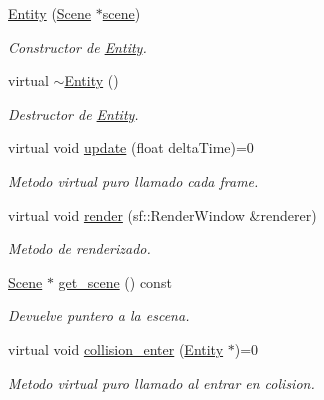 \begin{DoxyCompactItemize}
\item 
\mbox{\hyperlink{classexample_1_1_entity_aa2154c66b8b0142ef510137bb67e643b}{Entity}} (\mbox{\hyperlink{classexample_1_1_scene}{Scene}} $\ast$\mbox{\hyperlink{classexample_1_1_entity_ab851dbde4a16829f9fb77ab9a66b9f1e}{scene}})
\begin{DoxyCompactList}\small\item\em Constructor de \mbox{\hyperlink{classexample_1_1_entity}{Entity}}. \end{DoxyCompactList}\item 
virtual \mbox{\hyperlink{classexample_1_1_entity_a7ad532833fe996de3a728570b70a2c1d}{$\sim$\+Entity}} ()
\begin{DoxyCompactList}\small\item\em Destructor de \mbox{\hyperlink{classexample_1_1_entity}{Entity}}. \end{DoxyCompactList}\item 
virtual void \mbox{\hyperlink{classexample_1_1_entity_a5dded5c361451f2cfdf7ed3c7de1194f}{update}} (float delta\+Time)=0
\begin{DoxyCompactList}\small\item\em Metodo virtual puro llamado cada frame. \end{DoxyCompactList}\item 
virtual void \mbox{\hyperlink{classexample_1_1_entity_a44477ee1f9ac52e9073ae0f78ba735d5}{render}} (sf\+::\+Render\+Window \&renderer)
\begin{DoxyCompactList}\small\item\em Metodo de renderizado. \end{DoxyCompactList}\item 
\mbox{\hyperlink{classexample_1_1_scene}{Scene}} $\ast$ \mbox{\hyperlink{classexample_1_1_entity_a6d32a518949bb42bed3d13377c2ab7ad}{get\+\_\+scene}} () const
\begin{DoxyCompactList}\small\item\em Devuelve puntero a la escena. \end{DoxyCompactList}\item 
virtual void \mbox{\hyperlink{classexample_1_1_entity_a09f6836192c2f8bce91a7b4f6934b94e}{collision\+\_\+enter}} (\mbox{\hyperlink{classexample_1_1_entity}{Entity}} $\ast$)=0
\begin{DoxyCompactList}\small\item\em Metodo virtual puro llamado al entrar en colision. \end{DoxyCompactList}\item 

\end{DoxyCompactItemize}
